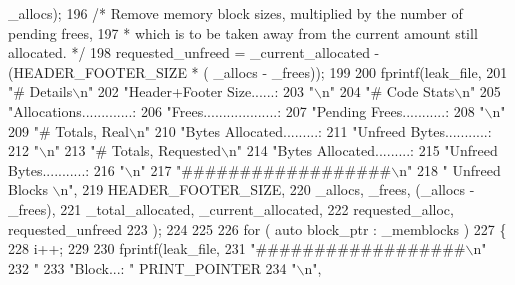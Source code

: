 \begin{DoxyCode}
      _allocs);
196         \textcolor{comment}{/* Remove memory block sizes, multiplied by the number of pending frees,
}
197 \textcolor{comment}{         * which is to be taken away from the current amount still allocated. */}
198         requested\_unfreed       = _current_allocated - (HEADER_FOOTER_SIZE * (
      _allocs - _frees));
199 
200         fprintf(leak\_file,
201                 \textcolor{stringliteral}{"# Details\(\backslash\)n"}
202                 \textcolor{stringliteral}{"Header+Footer Size......: %
203                 \textcolor{stringliteral}{"\(\backslash\)n"}
204                 \textcolor{stringliteral}{"# Code Stats\(\backslash\)n"}
205                 \textcolor{stringliteral}{"Allocations.............: %
206                 \textcolor{stringliteral}{"Frees...................: %
207                 \textcolor{stringliteral}{"Pending Frees...........: %
208                 \textcolor{stringliteral}{"\(\backslash\)n"}
209                 \textcolor{stringliteral}{"# Totals, Real\(\backslash\)n"}
210                 \textcolor{stringliteral}{"Bytes Allocated.........: %
211                 \textcolor{stringliteral}{"Unfreed Bytes...........: %
212                 \textcolor{stringliteral}{"\(\backslash\)n"}
213                 \textcolor{stringliteral}{"# Totals, Requested\(\backslash\)n"}
214                 \textcolor{stringliteral}{"Bytes Allocated.........: %
215                 \textcolor{stringliteral}{"Unfreed Bytes...........: %
216                 \textcolor{stringliteral}{"\(\backslash\)n"}
217                 \textcolor{stringliteral}{"##################\(\backslash\)n"}
218                 \textcolor{stringliteral}{"  Unfreed Blocks  \(\backslash\)n"},
219                 HEADER_FOOTER_SIZE,
220                 _allocs, _frees, (_allocs - _frees),
221                 _total_allocated, _current_allocated,
222                 requested\_alloc, requested\_unfreed
223                 );
224 
225 
226         \textcolor{keywordflow}{for} ( \textcolor{keyword}{auto} block\_ptr : _memblocks )
227         \{
228                 i++;
229 
230                 fprintf(leak\_file,
231                         \textcolor{stringliteral}{"##################\(\backslash\)n"}
232                         \textcolor{stringliteral}{"%
233                         \textcolor{stringliteral}{"Block...: "} PRINT_POINTER
234                         \textcolor{stringliteral}{"\(\backslash\)n"},
}}}}}}}}}
\end{DoxyCode}
